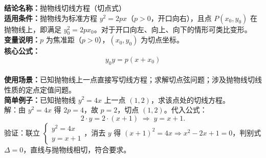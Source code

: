 \textbf{结论名称：}抛物线切线方程（切点式）\\
\textbf{适用条件：}抛物线为标准方程 \(y^2 = 2px\)（\(p>0\)，开口向右），且点 \(P(x_0, y_0)\) 在抛物线上，即满足 \(y_0^2 = 2p x_0\)。对于开口向左、向上、向下的情形可类比变形。\\
\textbf{变量说明：}\(p\) 为焦准距（\(p>0\)），\((x_0, y_0)\) 为切点坐标。\\
\textbf{核心公式：}\[
\boxed{y_0 y = p(x + x_0)}
\]\\
\textbf{使用场景：}已知抛物线上一点直接写切线方程；求解切点弦问题；涉及抛物线切线性质的定点定值问题。\\
\textbf{简单例子：}已知抛物线 \(y^2 = 4x\) 上一点 \((1,2)\)，求该点处的切线方程。\\
解：由 \(y^2 = 4x\) 得 \(2p = 4\)，故 \(p = 2\)，切点 \((1,2)\)。代入公式：
\[2 \cdot y = 2 \cdot (x + 1) \;\Longrightarrow\; y = x + 1.\]
验证：联立 \(\begin{cases} y^2 = 4x \\ y = x+1 \end{cases}\)，消去 \(y\) 得 \((x+1)^2 = 4x \Rightarrow x^2 - 2x + 1 = 0\)，判别式 \(\Delta = 0\)，直线与抛物线相切，符合要求。